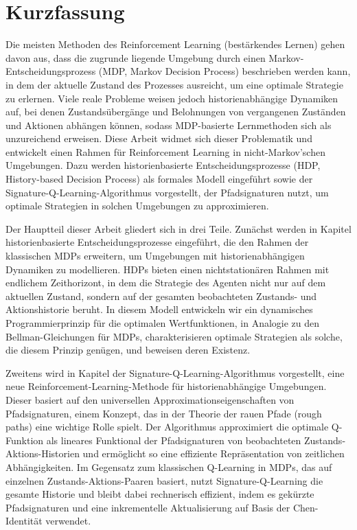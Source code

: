 \documentclass[
    a4paper,
    11pt,
    bibliography=totoc,
    listof=totoc,      
    headinclude=true,
    cleardoublepage=empty,
]{scrbook}
\theoremstyle{plain}
\theoremstyle{definition}
\theoremstyle{remark}
\begin{document}

\chapter*{Kurzfassung}

Die meisten Methoden des Reinforcement Learning (bestärkendes Lernen) gehen davon aus, dass die zugrunde liegende Umgebung durch einen Markov-Entscheidungsprozess (MDP, Markov Decision Process) beschrieben werden kann, in dem der aktuelle Zustand des Prozesses ausreicht, um eine optimale Strategie zu erlernen. Viele reale Probleme weisen jedoch historienabhängige Dynamiken auf, bei denen Zustandsübergänge und Belohnungen von vergangenen Zuständen und Aktionen abhängen können, sodass MDP-basierte Lernmethoden sich als unzureichend erweisen. Diese Arbeit widmet sich dieser Problematik und entwickelt einen Rahmen für Reinforcement Learning in nicht-Markov'schen Umgebungen. Dazu werden historienbasierte Entscheidungsprozesse (HDP, History-based Decision Process) als formales Modell eingeführt sowie der Signature-Q-Learning-Algorithmus vorgestellt, der Pfadsignaturen nutzt, um optimale Strategien in solchen Umgebungen zu approximieren.

Der Hauptteil dieser Arbeit gliedert sich in drei Teile. Zunächst werden in Kapitel  historienbasierte Entscheidungsprozesse eingeführt, die den Rahmen der klassischen MDPs erweitern, um Umgebungen mit historienabhängigen Dynamiken zu modellieren. HDPs bieten einen nichtstationären Rahmen mit endlichem Zeithorizont, in dem die Strategie des Agenten nicht nur auf dem aktuellen Zustand, sondern auf der gesamten beobachteten Zustands- und Aktionshistorie beruht. In diesem Modell entwickeln wir ein dynamisches Programmierprinzip für die optimalen Wertfunktionen, in Analogie zu den Bellman-Gleichungen für MDPs, charakterisieren optimale Strategien als solche, die diesem Prinzip genügen, und beweisen deren Existenz.

Zweitens wird in Kapitel  der Signature-Q-Learning-Algorithmus vorgestellt, eine neue Reinforcement-Learning-Methode für historienabhängige Umgebungen. Dieser basiert auf den universellen Approximationseigenschaften von Pfadsignaturen, einem Konzept, das in der Theorie der rauen Pfade (rough paths) eine wichtige Rolle spielt. Der Algorithmus approximiert die optimale Q-Funktion als lineares Funktional der Pfadsignaturen von beobachteten Zustands-Aktions-Historien und ermöglicht so eine effiziente Repräsentation von zeitlichen Abhängigkeiten. Im Gegensatz zum klassischen Q-Learning in MDPs, das auf einzelnen Zustands-Aktions-Paaren basiert, nutzt Signature-Q-Learning die gesamte Historie und bleibt dabei rechnerisch effizient, indem es gekürzte Pfadsignaturen und eine inkrementelle Aktualisierung auf Basis der Chen-Identität verwendet.
\end{document}
